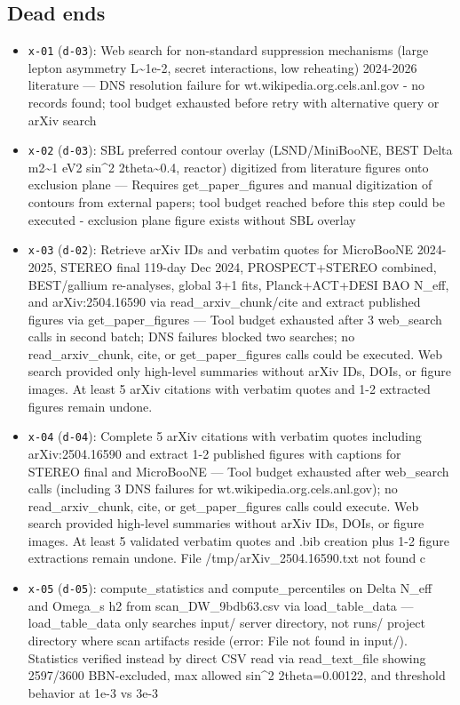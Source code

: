 \documentclass[11pt,a4paper]{article}
\begin{document}
\subsection{Dead ends}
\begin{itemize}
  \item \texttt{x-01} (\texttt{d-03}): Web search for non-standard suppression mechanisms (large lepton asymmetry L\textasciitilde{}1e-2, secret interactions, low reheating) 2024-2026 literature --- DNS resolution failure for wt.wikipedia.org.cels.anl.gov - no records found; tool budget exhausted before retry with alternative query or arXiv search
  \item \texttt{x-02} (\texttt{d-03}): SBL preferred contour overlay (LSND/MiniBooNE, BEST Delta m2\textasciitilde{}1 eV2 sin\textasciicircum{}2 2theta\textasciitilde{}0.4, reactor) digitized from literature figures onto exclusion plane --- Requires get\_paper\_figures and manual digitization of contours from external papers; tool budget reached before this step could be executed - exclusion plane figure exists without SBL overlay
  \item \texttt{x-03} (\texttt{d-02}): Retrieve arXiv IDs and verbatim quotes for MicroBooNE 2024-2025, STEREO final 119-day Dec 2024, PROSPECT+STEREO combined, BEST/gallium re-analyses, global 3+1 fits, Planck+ACT+DESI BAO N\_eff, and arXiv:2504.16590 via read\_arxiv\_chunk/cite and extract published figures via get\_paper\_figures --- Tool budget exhausted after 3 web\_search calls in second batch; DNS failures blocked two searches; no read\_arxiv\_chunk, cite, or get\_paper\_figures calls could be executed. Web search provided only high-level summaries without arXiv IDs, DOIs, or figure images. At least 5 arXiv citations with verbatim quotes and 1-2 extracted figures remain undone.
  \item \texttt{x-04} (\texttt{d-04}): Complete 5 arXiv citations with verbatim quotes including arXiv:2504.16590 and extract 1-2 published figures with captions for STEREO final and MicroBooNE --- Tool budget exhausted after web\_search calls (including 3 DNS failures for wt.wikipedia.org.cels.anl.gov); no read\_arxiv\_chunk, cite, or get\_paper\_figures calls could execute. Web search provided high-level summaries without arXiv IDs, DOIs, or figure images. At least 5 validated verbatim quotes and .bib creation plus 1-2 figure extractions remain undone. File /tmp/arXiv\_2504.16590.txt not found c
  \item \texttt{x-05} (\texttt{d-05}): compute\_statistics and compute\_percentiles on Delta N\_eff and Omega\_s h2 from scan\_DW\_9bdb63.csv via load\_table\_data --- load\_table\_data only searches input/ server directory, not runs/ project directory where scan artifacts reside (error: File not found in input/). Statistics verified instead by direct CSV read via read\_text\_file showing 2597/3600 BBN-excluded, max allowed sin\textasciicircum{}2 2theta=0.00122, and threshold behavior at 1e-3 vs 3e-3

\end{itemize}
\end{document}
